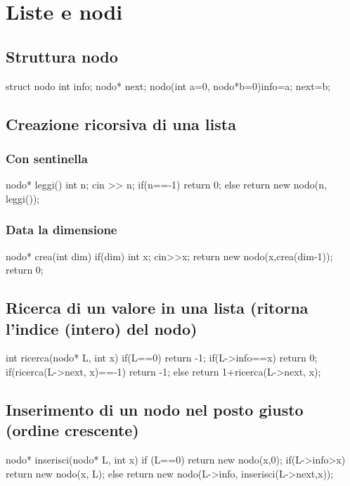 \chapter{Liste e nodi}
\section{Struttura nodo}
\begin{codice}

struct nodo{
	int info; 
	nodo* next; 
	nodo(int a=0, nodo*b=0){info=a; next=b;}
}
\end{codice}

\section{Creazione ricorsiva di una lista}
\subsection{Con sentinella}
\begin{codice}

nodo* leggi() {
    int n;
    cin >> n;
    if(n==-1) return 0;
    else return new nodo(n, leggi());
}
\end{codice}

\subsection{Data la dimensione}
\begin{codice}

nodo* crea(int dim){
   if(dim){
    	int x;
    	cin>>x;
    	return new nodo(x,crea(dim-1));
   }
   return 0;
}
\end{codice}

\section{Ricerca di un valore in una lista (ritorna l’indice (intero) del nodo)}
\begin{codice}

int ricerca(nodo* L, int x) {
    if(L==0) return -1;
    if(L->info==x) return 0;
    if(ricerca(L->next, x)==-1) return -1;
    else return 1+ricerca(L->next, x);
}
\end{codice}

\section{Inserimento di un nodo nel posto giusto (ordine crescente)}
\begin{codice}

nodo* inserisci(nodo* L, int x) {
    if (L==0) return new nodo(x,0);
    if(L->info>x) return new nodo(x, L);
    else return new nodo(L->info, inserisci(L->next,x));
}
\end{codice}

